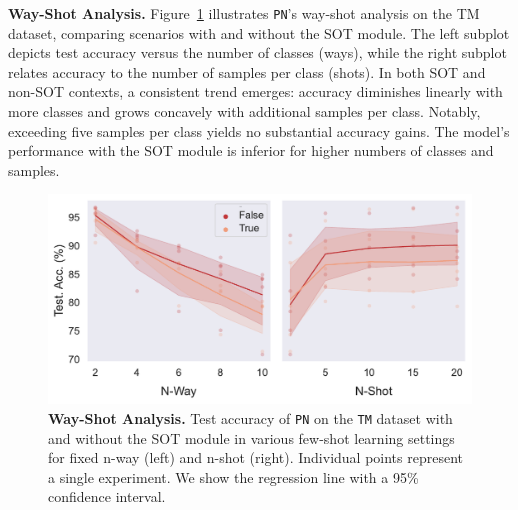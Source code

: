 

\textbf{Way-Shot Analysis.} Figure~\ref{fig:way-shot} illustrates \texttt{PN}'s way-shot analysis on the TM dataset, comparing scenarios with and without the SOT module. The left subplot depicts test accuracy versus the number of classes (ways), while the right subplot relates accuracy to the number of samples per class (shots). In both SOT and non-SOT contexts, a consistent trend emerges: accuracy diminishes linearly with more classes and grows concavely with additional samples per class. Notably, exceeding five samples per class yields no substantial accuracy gains. The model's performance with the SOT module is inferior for higher numbers of classes and samples.

\begin{figure}[h!]
    \centering
    \includegraphics[width=1\columnwidth]{figures/way-shot.pdf}
    \caption{\textbf{Way-Shot Analysis.} Test accuracy of \texttt{PN} on the \texttt{TM} dataset with and without the SOT module in various 
    few-shot learning settings for fixed n-way (left) and n-shot (right). Individual points represent a single experiment. We show the regression line with a 95\% confidence interval.}
    \label{fig:way-shot}
\end{figure}
